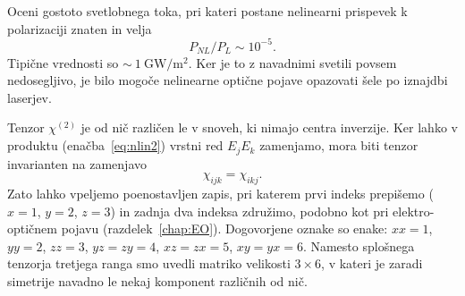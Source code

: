 \begin{definition}
Oceni gostoto svetlobnega toka, pri kateri postane nelinearni 
prispevek k polarizaciji znaten in velja 
 $$P_{NL}/P_L \sim 10^{-5}.$$
Tipične vrednosti so $\sim~1~\si{\giga\watt/\metre^2}$. Ker je to z navadnimi
svetili povsem nedosegljivo, je bilo mogoče nelinearne
optične pojave opazovati šele po iznajdbi laserjev.
\end{definition}
 
Tenzor $\chi^{(2)}$ je od nič različen le v snoveh, ki nimajo centra inverzije. 
Ker lahko v produktu (enačba~\ref{eq:nlin2}) vrstni red $E_j E_k$ zamenjamo, mora biti
tenzor invarianten na zamenjavo
\begin{equation}
\chi_{ijk} = \chi_{ikj}.
\label{eq:chijk}
\end{equation}
Zato lahko vpeljemo poenostavljen zapis, pri katerem prvi indeks 
prepišemo ($x=1$, $y=2$, $z=3$) in zadnja dva indeksa združimo, 
podobno kot pri elektro-optičnem pojavu (razdelek~\ref{chap:EO}).
Dogovorjene oznake so enake: $xx=1$, $yy=2$, $zz=3$, $yz=zy=4$, 
$xz=zx=5$, $xy=yx=6$. Namesto
splošnega tenzorja tretjega ranga smo uvedli matriko velikosti $3\times6$,
v kateri je zaradi simetrije navadno le nekaj komponent 
različnih od nič. 

